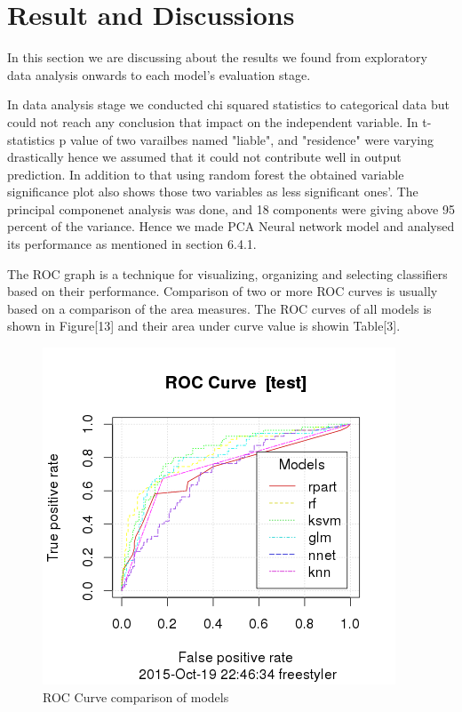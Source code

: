 \documentclass{article}\usepackage[]{graphicx}\usepackage[]{color}
\begin{document}
\section{Result and Discussions}\hspace{0.9cm}In this section we are discussing about the results we found from exploratory data analysis onwards to each model's evaluation stage. \par
\hspace{0.5cm} In data analysis stage we conducted chi squared statistics to categorical data but could not reach any conclusion that impact on the independent variable. In t-statistics p value of two varailbes named "liable", and "residence" were varying drastically hence we assumed that it could not contribute well in output prediction. In addition to that using random forest the obtained variable significance plot also shows those two variables as less significant ones'. The principal componenet analysis was done, and 18 components were giving above 95 percent of the variance. Hence we made PCA Neural network model and analysed its performance as mentioned in section 6.4.1. \par
\hspace{0.5cm} The ROC graph is a technique for visualizing, organizing and selecting classifiers based on their performance. Comparison of two or more ROC curves is usually based on a comparison of the area measures. The ROC curves of all models is shown in Figure[13] and their area under curve value is showin Table[3]. \par
\begin{figure}[h]
\begin{center}
\includegraphics [scale=0.80]{ROc.png}
\end{center}
\caption{ROC Curve comparison of models}
\end{figure}
\end{document}
